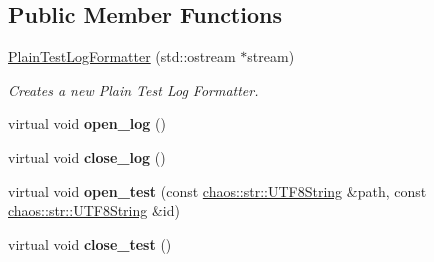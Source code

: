\subsection*{Public Member Functions}
\begin{DoxyCompactItemize}
\item 
\hypertarget{classchaos_1_1test_1_1log__formatter_1_1_plain_test_log_formatter_a728fd3a47d5ff50e84f2ab6a39cbfa87}{}\hyperlink{classchaos_1_1test_1_1log__formatter_1_1_plain_test_log_formatter_a728fd3a47d5ff50e84f2ab6a39cbfa87}{Plain\+Test\+Log\+Formatter} (std\+::ostream $\ast$stream)\label{classchaos_1_1test_1_1log__formatter_1_1_plain_test_log_formatter_a728fd3a47d5ff50e84f2ab6a39cbfa87}

\begin{DoxyCompactList}\small\item\em Creates a new Plain Test Log Formatter. \end{DoxyCompactList}\item 
\hypertarget{classchaos_1_1test_1_1log__formatter_1_1_plain_test_log_formatter_abdf1f9a1a7099f1af520b6dcc9c344b1}{}virtual void {\bfseries open\+\_\+log} ()\label{classchaos_1_1test_1_1log__formatter_1_1_plain_test_log_formatter_abdf1f9a1a7099f1af520b6dcc9c344b1}

\item 
\hypertarget{classchaos_1_1test_1_1log__formatter_1_1_plain_test_log_formatter_ad16ae535433e998b2af10ec0a2af329f}{}virtual void {\bfseries close\+\_\+log} ()\label{classchaos_1_1test_1_1log__formatter_1_1_plain_test_log_formatter_ad16ae535433e998b2af10ec0a2af329f}

\item 
\hypertarget{classchaos_1_1test_1_1log__formatter_1_1_plain_test_log_formatter_ae1e5cce2f2e5407cd619855c3daf18a8}{}virtual void {\bfseries open\+\_\+test} (const \hyperlink{classchaos_1_1str_1_1_u_t_f8_string}{chaos\+::str\+::\+U\+T\+F8\+String} \&path, const \hyperlink{classchaos_1_1str_1_1_u_t_f8_string}{chaos\+::str\+::\+U\+T\+F8\+String} \&id)\label{classchaos_1_1test_1_1log__formatter_1_1_plain_test_log_formatter_ae1e5cce2f2e5407cd619855c3daf18a8}

\item 
\hypertarget{classchaos_1_1test_1_1log__formatter_1_1_plain_test_log_formatter_aa6ff58563cec81e203461286504612f3}{}virtual void {\bfseries close\+\_\+test} ()\label{classchaos_1_1test_1_1log__formatter_1_1_plain_test_log_formatter_aa6ff58563cec81e203461286504612f3}

\end{DoxyCompactItemize}
